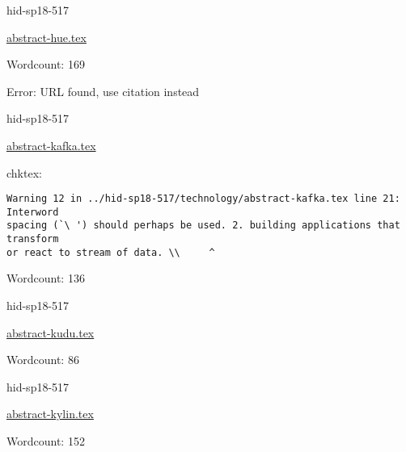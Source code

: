 

\begin{IU}

hid-sp18-517

\href{https://github.com/cloudmesh-community/hid-sp18-517/blob/master//technology/abstract-hue.tex}{abstract-hue.tex}

 

Wordcount: 169

Error: URL found, use citation instead
\end{IU}



\begin{IU}

hid-sp18-517

\href{https://github.com/cloudmesh-community/hid-sp18-517/blob/master//technology/abstract-kafka.tex}{abstract-kafka.tex}

 
chktex:
\begin{tiny}
\begin{verbatim}
Warning 12 in ../hid-sp18-517/technology/abstract-kafka.tex line 21: Interword
spacing (`\ ') should perhaps be used. 2. building applications that transform
or react to stream of data. \\     ^
\end{verbatim}
\end{tiny}

Wordcount: 136

\end{IU}



\begin{IU}

hid-sp18-517

\href{https://github.com/cloudmesh-community/hid-sp18-517/blob/master//technology/abstract-kudu.tex}{abstract-kudu.tex}

 

Wordcount: 86

\end{IU}



\begin{IU}

hid-sp18-517

\href{https://github.com/cloudmesh-community/hid-sp18-517/blob/master//technology/abstract-kylin.tex}{abstract-kylin.tex}

 

Wordcount: 152

\end{IU}

